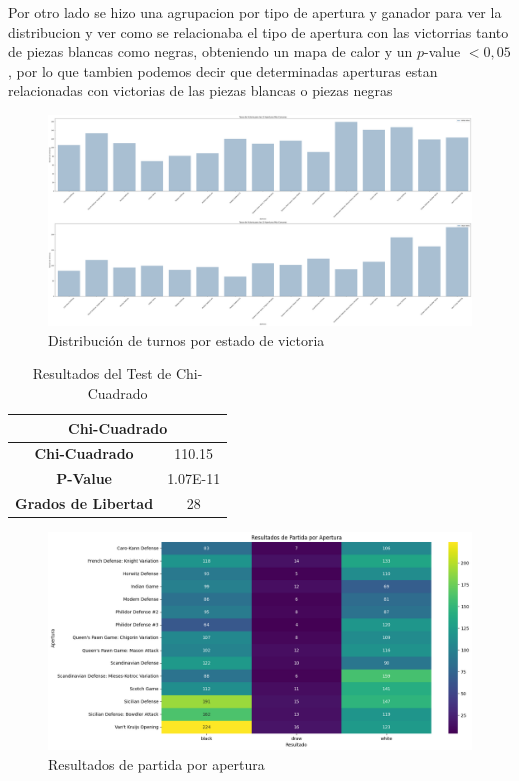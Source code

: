 \documentclass[a4paper, 12pt]{article}
\begin{document}
\vspace{5mm} %

Por otro lado se hizo una agrupacion por tipo de apertura y ganador para ver la distribucion y ver como se relacionaba el tipo de apertura con las victorrias tanto de piezas blancas como negras, obteniendo un mapa de calor y un $p$-value $< 0{,}05$, 
por lo que tambien podemos decir que determinadas aperturas estan relacionadas con victorias de las piezas blancas o piezas negras 


\begin{figure}[H]
    \centering
    \includegraphics[width=\textwidth]{../Imagenes/Hipotesis_2.png}
    \caption{Distribución de turnos por estado de victoria}
    \label{fig:turns_victory_status}
\end{figure}

\begin{table}[h!]
    \centering
    \begin{tabular}{|c|c|}
        \hline
        \multicolumn{2}{|c|}{\textbf{Chi-Cuadrado}} \\ \hline
        \textbf{Chi-Cuadrado} & 110.15 \\ \hline
        \textbf{P-Value} & 1.07E-11 \\ \hline
        \textbf{Grados de Libertad} & 28 \\ \hline
    \end{tabular}
    \caption{Resultados del Test de Chi-Cuadrado}
    \label{table:chi_squared}
\end{table}

\begin{figure}[H]
    \centering
    \includegraphics[width=\textwidth]{../Imagenes/Hipotesis_2_2.png}
    \caption{Resultados de partida por apertura}
    \label{fig:results_opening}
\end{figure}
\end{document}
